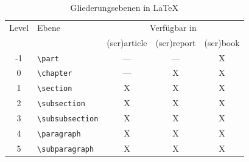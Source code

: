 \begin {table} [ht]
\begin{tabular}{clccc}
	Level	& Ebene 					& \multicolumn{3}{c}{Verfügbar in }\\
			&							& (scr)article 	& (scr)report 	& (scr)book	\\
	-1		& \verb|\part| 				& ---			& ---			& X\\ 
	0		& \verb|\chapter|			& ---			& X				& X\\ 
	1		& \verb|\section| 			& X				& X				& X\\ 
	2		& \verb|\subsection| 		& X				& X				& X\\ 
	3		& \verb|\subsubsection| 	& X				& X				& X\\ 
	4		& \verb|\paragraph|		 	& X				& X				& X\\ 
	5		& \verb|\subparagraph|	 	& X				& X				& X\\ 
	
\end{tabular}
\caption {Gliederungsebenen in \LaTeX}
\end {table}
\FloatBarrier